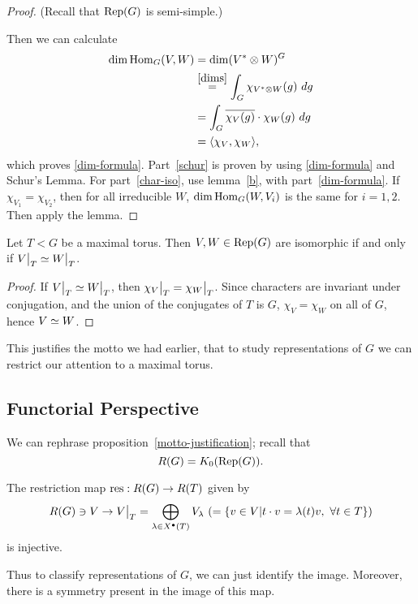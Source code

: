 \begin{proof}
(Recall that $\mathrm{Rep}(G)$ is semi-simple.)

Then we can calculate
\begin{align*}
\dim \operatorname{Hom}_G(V, W) & = \dim (V^* \otimes W)^G \\
& \stackrel{\ref{dims}}{=} \int_G \chi_{V^* \otimes W} (g) \ dg\\
& = \int_G \overline{\chi_V(g)} \cdot \chi_W(g) \ dg \\
& = \langle \chi_V, \chi_W \rangle,
\end{align*}
which proves \ref{dim-formula}. Part~\ref{schur} is proven by using
\ref{dim-formula} and Schur's Lemma. For part~\ref{char-iso}, use lemma~\ref{b},
with part~\ref{dim-formula}. If $\chi_{V_1} = \chi_{V_2}$, then for all
irreducible $W$, $\dim \operatorname{Hom}_G(W, V_i)$ is the same for $i = 1, 2$. Then 
apply the lemma.
\end{proof}

\begin{prop}\label{motto-justification}
Let $T < G$ be a maximal torus. Then $V, W \in \mathrm{Rep}(G)$ are isomorphic if and
only if $\restr{V}{T} \iso \restr{W}{T}$.
\end{prop}

\begin{proof}
If $\restr{V}{T} \iso \restr{W}{T}$, then
$\restr{\chi_V}{T} = \restr{\chi_W}{T}$. Since characters are invariant under
conjugation, and the union of the conjugates of $T$ is $G$, $\chi_V = \chi_W$ on
all of $G$, hence $V \simeq W$.
\end{proof}

This justifies the motto we had earlier, that to study representations of $G$ 
we can restrict our attention to a maximal torus.

\subsection{Functorial Perspective}

We can rephrase proposition~\ref{motto-justification}; recall that
\[ R(G) = K_0(\mathrm{Rep}(G)). \]

\begin{prop}
The restriction map $\operatorname{res}: R(G) \rightarrow R(T)$ given by 
\[ R(G) \ni V \rightarrow \restr{V}{T}
    = \bigoplus_{\lambda \in \cgroup T} V_\lambda
    \ (= \{ v \in V | t \cdot v = \lambda(t) v, \ \forall t \in T \}) \]
is injective.
\end{prop}

Thus to classify representations of $G$, we can just identify the image.
Moreover, there is a symmetry present in the image of this map.

